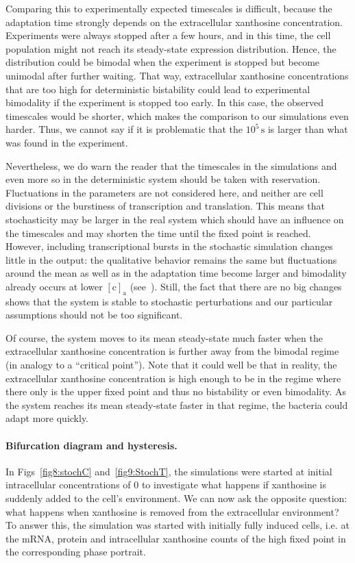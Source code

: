 \documentclass[10pt,letterpaper]{article}
\newcommand{\unit}[1]{\,\mathrm{#1}}
\begin{document}
	Comparing this to experimentally expected timescales is difficult,
	because the adaptation time strongly depends on the extracellular xanthosine
	concentration. Experiments were always stopped after a few hours, and in
	this time, the cell population might not reach its steady-state expression
	distribution. Hence, the distribution could be bimodal when the experiment
	is stopped but become unimodal after further waiting. That way,
	extracellular xanthosine concentrations that are too high for deterministic
	bistability could lead to experimental bimodality if the experiment is
	stopped too early. In this case, the observed timescales would be
	shorter, which makes the comparison to our simulations even harder. Thus, we
	cannot say if it is problematic that the $10^5 \unit{s}$ is larger than what
	was found in the experiment. 
	
	Nevertheless, we do warn the reader that the timescales in the simulations and even more so in the deterministic system
	should be taken with reservation. Fluctuations in the parameters are not considered here, and neither are cell divisions or the burstiness of transcription and translation. This means
	that stochasticity may be larger in the real system which should have an
	influence on the timescales and may shorten the time until the fixed point is reached. However, including transcriptional bursts in the stochastic simulation changes little in the output: the qualitative behavior remains the same but fluctuations around the mean as well as in the adaptation time become larger and bimodality already occurs at lower $\mathrm{[c]_a}$ (see~). Still, the fact that there are no big changes shows that the system is stable to stochastic perturbations and our particular assumptions should not be too significant.
	
	Of course, the system moves to its mean steady-state much faster when the extracellular xanthosine concentration is further away from the bimodal regime (in analogy to a ``critical point''). 
	Note that it could well be that in reality, the extracellular xanthosine concentration is high enough to be in the regime where there only is the upper fixed point and thus no bistability or even bimodality. As the system reaches its mean steady-state faster in that regime, the bacteria could adapt more quickly.
	
	\paragraph*{Bifurcation diagram and hysteresis.} 
	In Figs~\ref{fig8:stochC} and~\ref{fig9:StochT}, the simulations were started at initial intracellular concentrations of 0 to investigate what happens if xanthosine is suddenly added to the cell's environment. We can now ask the opposite question: what happens when xanthosine is removed from the extracellular environment? To answer this, the simulation was started with initially fully	induced cells, i.e. at the mRNA, protein and intracellular xanthosine counts of the high fixed point in the corresponding phase portrait. 
	
\end{document}
